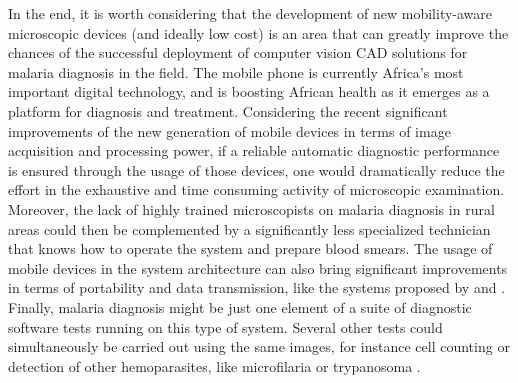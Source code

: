 \documentclass[sensors,review,submit,moreauthors,pdftex,10pt,a4paper]{mdpi}
\begin{document}
	In the end, it is worth considering that the development of new mobility-aware microscopic devices (and ideally low cost) is an area that can greatly improve the chances of the successful deployment of computer vision CAD solutions for malaria diagnosis in the field.
	The mobile phone is currently Africa's most important digital technology, and is boosting African health as it emerges as a platform for diagnosis and treatment.
	Considering the recent significant improvements of the new generation of mobile devices in terms of image acquisition and processing power, if a reliable automatic diagnostic performance is ensured through the usage of those devices, one would dramatically reduce the effort in the exhaustive and time consuming activity of microscopic examination.
	Moreover, the lack of highly trained microscopists on malaria diagnosis in rural areas could then be complemented by a significantly less specialized technician that knows how to operate the system and prepare blood smears. The usage of mobile devices in the system architecture can also bring significant improvements in terms of portability and data transmission, like the systems proposed by \cite{Oliveira2017} and \cite{Rosado2017}.
	Finally, malaria diagnosis might be just one element of a suite of diagnostic software tests running on this type of system. Several other tests could simultaneously be carried out using the same images, for instance cell counting or detection of other hemoparasites, like microfilaria or trypanosoma \cite{Rosado2016}.
	
	
	
	
	\vspace{6pt}
	
	
	
	
\end{document}
